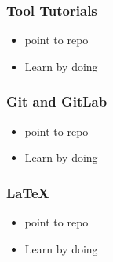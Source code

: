 \documentclass[t,12pt,numbers,fleqn]{beamer}
\begin{document}
\begin{frame}
\frametitle{Tool Tutorials}
\begin{itemize}
\item point to repo
\item Learn by doing
\end{itemize}
\end{frame}


\begin{frame}
\frametitle{Git and GitLab}
\begin{itemize}
\item point to repo
\item Learn by doing
\end{itemize}
\end{frame}


\begin{frame}
\frametitle{LaTeX}
\begin{itemize}
\item point to repo
\item Learn by doing
\end{itemize}
\end{frame}

\end{document}
